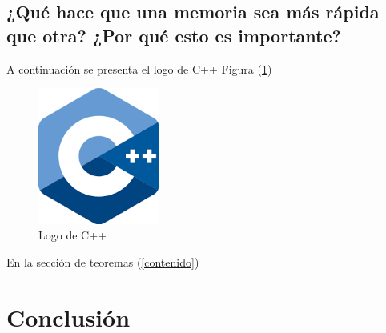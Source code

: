 \documentclass{article}
\begin{document}
\subsection{¿Qué hace que una memoria sea más rápida que otra? ¿Por qué esto es importante?}
A continuación se presenta el logo de C++ Figura (\ref{fig:cpplogo})

\begin{figure}[h]
\includegraphics[width=4cm]{cpplogo.png}
\centering
\caption{Logo de C++}
\label{fig:cpplogo}
\end{figure}

En la sección de teoremas (\ref{contenido})

\section{Conclusión} \label{conclulsion}



\end{document}
